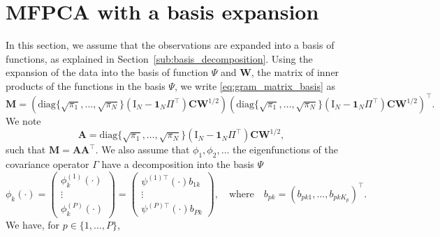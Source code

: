 

\section{MFPCA with a basis expansion} %
\label{sub:with_a_basis_expansion}

In this section, we assume that the observations are expanded into a basis of functions, as explained in Section~\ref{sub:basis_decomposition}. Using the expansion of the data into the basis of function $\Psi$ and $\mathbf{W}$, the matrix of inner products of the functions in the basis $\Psi$, we write \eqref{eq:gram_matrix_basis} as
\begin{equation}
    \mathbf{M} = \left(\text{diag}\{
        \sqrt{\pi_1}, \dots, \sqrt{\pi_N}\}\left(\mathrm{I}_{\!N} - \mathbf{1}_{\!N}\Pi^\top\right) \mathbf{C}\mathbf{W}^{1/2}\right)\left(\text{diag}\{
        \sqrt{\pi_1}, \dots, \sqrt{\pi_N}\}\left(\mathrm{I}_{\!N} - \mathbf{1}_{\!N}\Pi^\top\right) \mathbf{C}\mathbf{W}^{1/2}\right)^\top.
\end{equation}
We note
\begin{equation}
    \mathbf{A} = \text{diag}\{\sqrt{\pi_1}, \dots, \sqrt{\pi_N}\}\left(\mathrm{I}_{\!N} - \mathbf{1}_{\!N}\Pi^\top\right) \mathbf{C}\mathbf{W}^{1/2},
\end{equation}
such that $\mathbf{M} = \mathbf{A}\mathbf{A}^\top$.
We also assume that $\phi_1, \phi_2, \dots$ the eigenfunctions of the covariance operator $\Gamma$ have a decomposition into the basis $\Psi$
\begin{equation}
    \phi_k(\cdot) = 
        \begin{pmatrix} 
            \phi_k^{(1)}(\cdot) \\
            \vdots \\
            \phi_k^{(P)}(\cdot)
        \end{pmatrix} = 
        \begin{pmatrix} 
            \psi^{(1) \top}(\cdot) b_{1k} \\
            \vdots \\
            \psi^{(P) \top}(\cdot) b_{Pk}
        \end{pmatrix}, \quad\text{where}\quad
        b_{pk} = \left(b_{p k 1}, \dots, b_{p k K_p} \right)^\top.
\end{equation}
We have, for $p \in \{1, \dots, P\}$,
